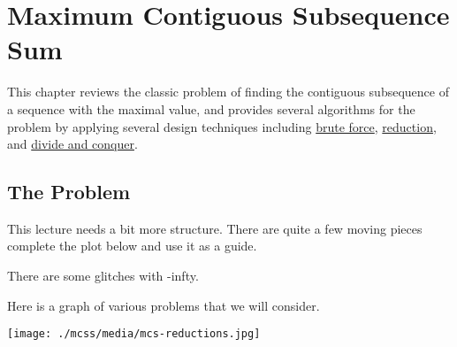 \chapter{Maximum Contiguous Subsequence Sum}
\label{ch:mcss}

\begin{cluster}
\label{grp:prmbl:mcss::reviews}

\begin{preamble}
\label{prmbl:mcss::reviews}
This chapter reviews the classic problem of finding the contiguous
subsequence of a sequence with the maximal value, 
and provides several algorithms for the problem by applying several design techniques including
\href{sec:design::bf}{brute force},
\href{sec:design::reduction}{reduction}, and
\href{ch:design::dc}{divide and conquer}.

\end{preamble}
\end{cluster}


\section{The Problem}
\label{ch:mcss::problem}

\begin{cluster}
\label{grp:tch:mcss::lecture}

\begin{teachnote}
\label{tch:mcss::lecture}
This lecture needs a bit more structure.  There are quite a few moving
pieces complete the plot below and use it as a guide.  

There are some glitches with -infty.  

\end{teachnote}
\end{cluster}

\begin{cluster}
\label{grp:tch:mcss::graph}

\begin{teachnote}
\label{tch:mcss::graph}
Here is a graph of various problems that we will consider.

\texttt{[image: ./mcss/media/mcs-reductions.jpg]}

\end{teachnote}
\end{cluster}

